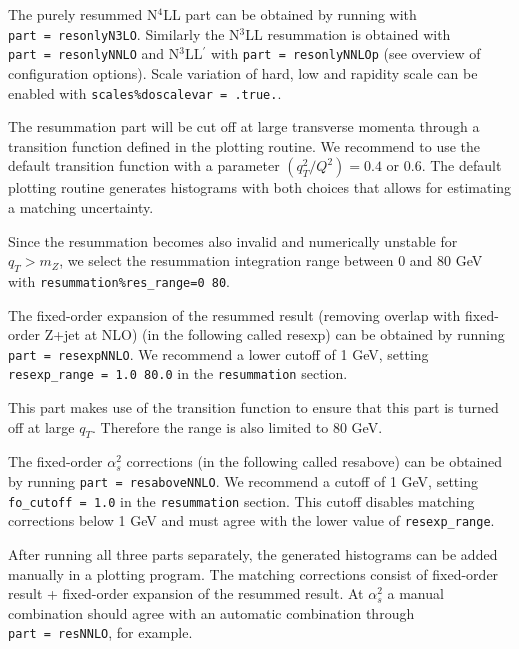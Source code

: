 
The purely resummed N$^4$LL part can be obtained by running with
\texttt{part\ =\ resonlyN3LO}. Similarly the N$^3$LL resummation is
obtained with \texttt{part\ =\ resonlyNNLO} and N$^3$LL$^\prime$
with \texttt{part\ =\ resonlyNNLOp} (see overview of configuration
options). Scale variation of hard, low and rapidity scale can be enabled
with \texttt{scales\%doscalevar\ =\ .true.}.

The resummation part will be cut off at large transverse momenta through
a transition function defined in the plotting routine. We recommend to
use the default transition function with a parameter $(q_T^2/Q^2)=0.4$
or $0.6$. The default plotting routine generates histograms with both
choices that allows for estimating a matching uncertainty.

Since the resummation becomes also invalid and numerically unstable for
$q_T>m_Z$, we select the resummation integration range between $0$
and $80$ GeV with \texttt{resummation\%res\_range=0\ 80}.




The fixed-order expansion of the resummed result (removing overlap with
fixed-order Z+jet at NLO) (in the following called resexp) can be
obtained by running \texttt{part\ =\ resexpNNLO}. We recommend a lower
cutoff of 1 GeV, setting \texttt{resexp\_range\ =\ 1.0\ 80.0} in the
\texttt{resummation} section.

This part makes use of the transition function to ensure that this part
is turned off at large $q_T$. Therefore the range is also limited to
80 GeV.




The fixed-order $\alpha_s^2$ corrections (in the following called
resabove) can be obtained by running \texttt{part\ =\ resaboveNNLO}. We
recommend a cutoff of 1 GeV, setting \texttt{fo\_cutoff\ =\ 1.0} in the
\texttt{resummation} section. This cutoff disables matching corrections
below 1 GeV and must agree with the lower value of
\texttt{resexp\_range}.



After running all three parts separately, the generated histograms can
be added manually in a plotting program. The matching corrections
consist of fixed-order result + fixed-order expansion of the resummed
result. At $\alpha_s^2$ a manual combination should agree with an
automatic combination through \texttt{part\ =\ resNNLO}, for example.


